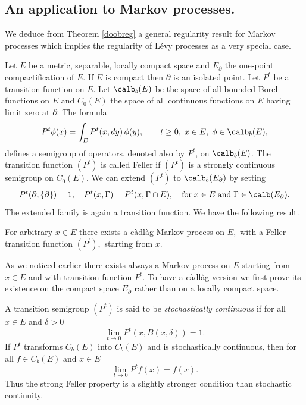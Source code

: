 \documentclass[preprint]{imsart}
\begin{document}
{\subsection{An application to Markov processes.}
We deduce from Theorem \ref{doobreg}
a general regularity result for Markov
processes which implies the regularity of  L\'evy
processes as a very special case.

Let $E$ be a metric, separable, locally compact space and
$E_\partial$ the one-point compactification of $E$. If $E$  is
compact then $\partial$ is an isolated point. Let $P^t$ be a
transition function on $E$. Let $\calb_b(E)$ be the space of all
bounded Borel functions on $E$ and $C_0(E)$ the space of all
continuous functions on $E$ having limit zero at $\partial$.
The formula
$$
P^t\phi(x)=\int_E P^t(x,dy)\, \phi(y),
\qquad t\ge 0,\; x\in E, \; \phi\in\calb_b(E),
$$
defines a semigroup of operators, denoted also by $P^t$, on
$\calb_b(E)$.
The transition function $(P^t)$ is called Feller if
$(P^t)$ is a strongly continuous semigroup on $C_0(E)$.
We can extend $(P^t)$ to $\calb_b(E_\partial)$ by setting
$$
P^t(\partial, \{\partial\})=1,
\quad
P^t(x, \Gamma)=P^t(x, \Gamma\cap E),
\quad {\rm for\;} x\in E \; {\rm and}\;
\Gamma\in \calb(E_\partial).
$$
The extended family is again a transition function. We have the
following result.

\begin{Theorem}\label{regmarkov}
  For arbitrary $x\in E$ there exists a
  c\`adl\`ag  Markov process on $E,$ with a Feller transition function
  $(P^t),$ starting from $x$.
\end{Theorem}

\begin{Remark}\begin{em}
  As we noticed earlier there exists always a Markov process on
  $E$ starting from $x\in E$ and with transition function $P^t$.
  To have a   c\`adl\`ag version we first prove its existence on
  the compact space $E_\partial$ rather than on a locally compact
  space.
  \end{em}
\end{Remark}


\begin{Remark}\begin{em}
  A transition semigroup $(P^t)$ is said to be {\em stochastically
  continuous} if for all $x\in E$ and $\delta>0$
  $$
  \lim_{t\to 0}P^t(x,B(x,\delta))=1.
  $$
If $P^t$ transforms $C_b(E)$ into $C_b(E)$ and is
stochastically continuous, then for all $f\in C_b(E)$ and $x\in E$
  $$
  \lim_{t\to 0}P^tf(x)=f(x).
  $$
Thus the strong Feller property is a slightly stronger condition than
stochastic continuity.
  \end{em}
\end{Remark}

}
\end{document}

